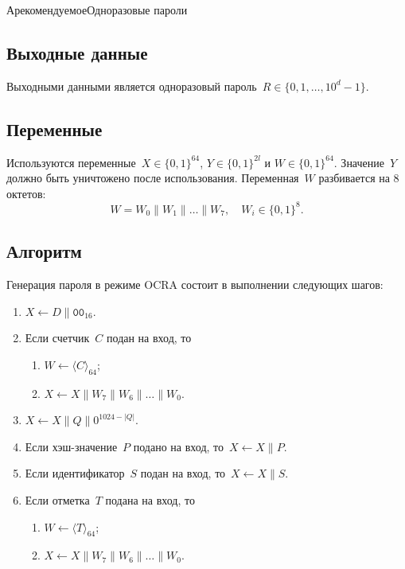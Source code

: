 \begin{appendix}{А}{рекомендуемое}{Одноразовые пароли}
\subsection{Выходные данные}

Выходными данными является одноразовый пароль~$R\in\{0,1,\ldots,10^d-1\}$.

\subsection{Переменные}

Используются переменные~$X\in\{0,1\}^{64}$, $Y\in\{0,1\}^{2l}$ 
и $W\in\{0,1\}^{64}$. 
%
Значение~$Y$ должно быть уничтожено после использования.
%
Переменная~$W$ разбивается на $8$ октетов:
$$
W=W_0\parallel W_1\parallel\ldots\parallel W_7,\quad
W_i\in\{0,1\}^8.
$$

\subsection{Алгоритм}

Генерация пароля в режиме OCRA состоит в выполнении следующих шагов:
\begin{enumerate}
\item
$X\leftarrow D\parallel\texttt{00}_{16}$.

\item
Если счетчик~$C$ подан на вход, то
\begin{enumerate}
\item
$W\leftarrow\langle C\rangle_{64}$;

\item
$X\leftarrow X\parallel W_7\parallel W_6\parallel\ldots\parallel W_0$.
\end{enumerate}

\item
$X\leftarrow X\parallel Q\parallel 0^{1024-|Q|}$.

\item
Если хэш-значение~$P$ подано на вход, 
то~$X\leftarrow X\parallel P$.

\item
Если идентификатор~$S$ подан на вход, 
то~$X\leftarrow X\parallel S$.

\item
Если отметка~$T$ подана на вход, то
\begin{enumerate}
\item
$W\leftarrow\langle T\rangle_{64}$;

\item
$X\leftarrow X\parallel W_7\parallel W_6\parallel\ldots\parallel W_0$.
\end{enumerate}


\end{enumerate}
\end{appendix}
